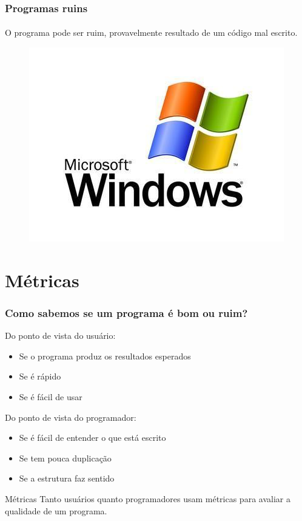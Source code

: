 \documentclass{beamer}
\begin{document}
\begin{frame}
  \frametitle{Programas ruins}
  \framesubtitle{}

  O programa pode ser ruim, provavelmente resultado de um código mal escrito.
  \begin{figure}
    \begin{center}
      \includegraphics[height=.5\textheight]{images/windows.jpg}
    \end{center}
  \end{figure}
\end{frame}

\section{Métricas}
\begin{frame}
  \frametitle{Como sabemos se um programa é bom ou ruim?}
  Do ponto de vista do usuário:
  \begin{itemize}
    \item Se o programa produz os resultados esperados
    \item Se é rápido
    \item Se é fácil de usar
  \end{itemize}

  Do ponto de vista do programador:
  \begin{itemize}
    \item Se é fácil de entender o que está escrito
    \item Se tem pouca duplicação
    \item Se a estrutura faz sentido
  \end{itemize}

  \begin{block}{Métricas}
    Tanto usuários quanto programadores usam métricas para avaliar a qualidade de um programa.
  \end{block}
\end{frame}
\end{document}
